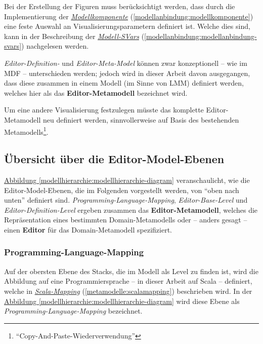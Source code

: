 \documentclass[a4paper,10pt]{sphinxmanual}
\begin{document}
Bei der Erstellung der Figuren muss berücksichtigt werden, dass durch die Implementierung der {\hyperref[modellanbindung:modellkomponente]{\emph{Modellkomponente}}} (\autoref*{modellanbindung:modellkomponente}) eine feste Auswahl an Visualisierungsparametern definiert ist.
Welche dies sind, kann in der Beschreibung der {\hyperref[modellanbindung:modellanbindung-svars]{\emph{Modell-SVars}}} (\autoref*{modellanbindung:modellanbindung-svars}) nachgelesen werden.

\emph{Editor-Definition-} und \emph{Editor-Meta-Model} können zwar konzeptionell – wie im MDF – unterschieden werden;
jedoch wird in dieser Arbeit davon ausgegangen, dass diese zusammen in einem Modell (im Sinne von LMM) definiert werden, welches hier als das \textbf{Editor-Metamodell} bezeichnet wird.

Um eine andere Visualisierung festzulegen müsste das komplette Editor-Metamodell neu definiert werden, sinnvollerweise auf Basis des bestehenden Metamodells\footnote{
"`Copy-And-Paste-Wiederverwendung"'
}.


\subsection{Übersicht über die Editor-Model-Ebenen}
\label{modellhierarchie:ubersicht-uber-die-editor-model-ebenen}
\hyperref[modellhierarchie:modellhierarchie-diagram]{Abbildung  \ref*{modellhierarchie:modellhierarchie-diagram}} veranschaulicht, wie die Editor-Model-Ebenen, die im Folgenden vorgestellt werden, von "`oben nach unten"' definiert sind.
\emph{Programming-Language-Mapping}, \emph{Editor-Base-Level} und \emph{Editor-Definition-Level} ergeben zusammen das \textbf{Editor-Metamodell},
welches die Repräsentation eines bestimmten Domain-Metamodells oder – anders gesagt – einen \textbf{Editor} für das Domain-Metamodell spezifiziert.


\subsubsection{Programming-Language-Mapping}
\label{modellhierarchie:programming-language-mapping}
Auf der obersten Ebene des Stacks, die im Modell als Level  zu finden ist, wird die Abbildung auf eine Programmiersprache – in dieser Arbeit auf Scala – definiert, welche in {\hyperref[metamodelle:scalamapping]{\emph{Scala-Mapping}}} (\autoref*{metamodelle:scalamapping}) beschrieben wird.
In der \hyperref[modellhierarchie:modellhierarchie-diagram]{Abbildung  \ref*{modellhierarchie:modellhierarchie-diagram}} wird diese Ebene als \emph{Programming-Language-Mapping} bezeichnet.
\end{document}
